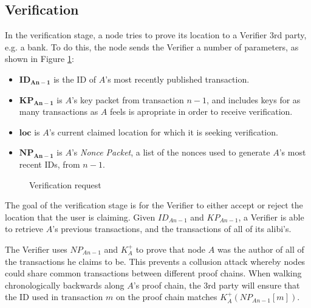 \documentclass[12pt]{article}
\begin{document}
\subsection{Verification}
\begin{minipage}{0.5\linewidth}
In the verification stage, a node tries to prove its location to a Verifier 3rd party, e.g. a bank. To do this, the node sends the Verifier a number of parameters, as shown in Figure \ref{fig:verify_request}:
\begin{itemize}[noitemsep,topsep=0pt]
	\item[] $\mathbf{ID_{An-1}}$ is the ID of $A$'s most recently published transaction.
	\item[] $\mathbf{KP_{An-1}}$ is $A$'s key packet from transaction $n-1$, and includes keys for as many transactions as $A$ feels is apropriate in order to receive verification.
	\item[] $\mathbf{loc}$ is $A$'s current claimed location for which it is seeking verification.
	\item[] $\mathbf{NP_{An-1}}$ is $A$'s \textit{Nonce Packet}, a list of the nonces used to generate $A$'s most recent IDs, from $n-1$.	
\end{itemize}
\end{minipage}
\hfill
\begin{minipage}[c]{0.5\linewidth}
\begin{figure}[H]

\caption{Verification request}
\label{fig:verify_request}
\end{figure}
\end{minipage}


The goal of the verification stage is for the Verifier to either accept or reject the location that the user is claiming. Given $ID_{An-1}$ and $KP_{An-1}$, a Verifier is able to retrieve $A$'s previous transactions, and the transactions of all of its alibi's.

The Verifier uses $NP_{An-1}$ and $K^{+}_A$ to prove that node $A$ was the author of all of the transactions he claims to be. This prevents a collusion attack whereby nodes could share common transactions between different proof chains. When walking chronologically backwards along $A$'s proof chain, the 3rd party will ensure that the ID used in transaction $m$ on the proof chain matches $K^{+}_A(NP_{An-1}[m])$.
\end{document}
